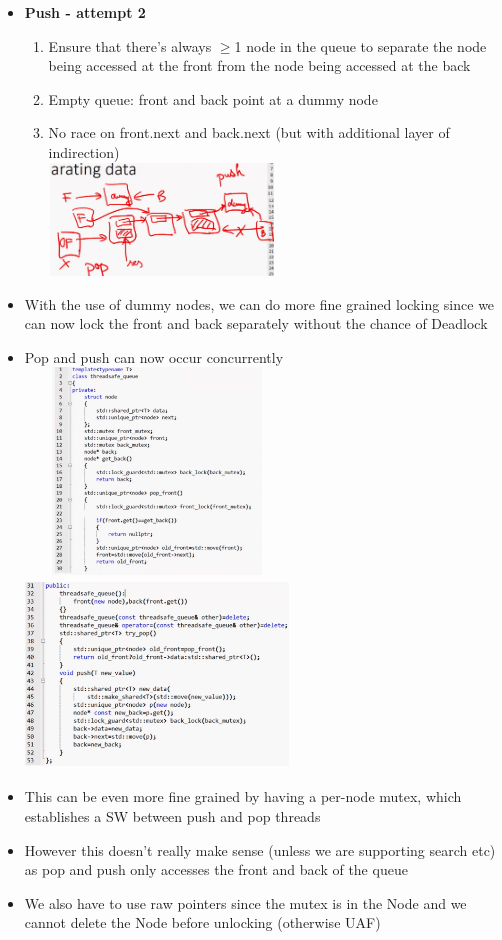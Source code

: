 \documentclass[10pt, landscape]{article}
\begin{document}
\begin{multicols}{4}
\begin{itemize}
\item \textbf{Push - attempt 2} \\
\begin{enumerate}
    \item Ensure that there's always $\ge$1 node in the queue to separate the node being accessed at the front from the node being accessed at the back 
    \item Empty queue: front and back point at a dummy node 
    \item No race on front.next  and back.next (but with additional layer of indirection) \\
    \includegraphics*[width=6cm,height=3cm]{dummy2.png}
\end{enumerate}

\item With the use of dummy nodes, we can do more fine grained locking since we can now lock the front and back separately without the chance of Deadlock 
\item Pop and push can now occur concurrently\\
\includegraphics*[width=7cm,height=5.5cm]{queue1.png}
\includegraphics*[width=7cm,height=5cm]{queue2.png} \\
\item This can be even more fine grained by having a per-node mutex, which establishes a SW between push and pop threads
\item However this doesn't really make sense (unless we are supporting search etc) as pop and push only accesses the front and back of the queue 
\item We also have to use raw pointers since the mutex is in the Node and we cannot delete the Node before unlocking (otherwise UAF)
\end{itemize}


\end{multicols}
\end{document}
